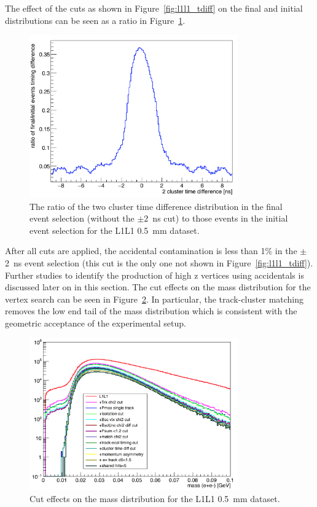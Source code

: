 The effect of the cuts as shown in Figure~\ref{fig:l1l1_tdiff} on the final and initial distributions can be seen as a ratio in Figure~\ref{fig:l1l1_tdiffR}.

\begin{figure}[H]
  \centering
      \includegraphics[width=0.8\textwidth]{plots/ratio_tdiff_cuts.png}
  \caption{The ratio of the two cluster time difference distribution in the final event selection (without the $\pm2$~ns cut) to those events in the initial event selection for the L1L1 0.5~mm dataset.}
  \label{fig:l1l1_tdiffR}
\end{figure}

After all cuts are applied, the accidental contamination is less than 1$\%$ in the $\pm$ 2~ns event selection (this cut is the only one not shown in Figure~\ref{fig:l1l1_tdiff}). Further studies to identify the production of high z vertices using accidentals is discussed later on in this section. The cut effects on the mass distribution for the vertex search can be seen in Figure~\ref{fig:l1l1_mass}. In particular, the track-cluster matching removes the low end tail of the mass distribution which is consistent with the geometric acceptance of the experimental setup.

\begin{figure}[H]
  \centering
      \includegraphics[width=0.8\textwidth]{plots/mass_L1L1_cuts.png}
  \caption{Cut effects on the mass distribution for the L1L1 0.5~mm dataset.}
  \label{fig:l1l1_mass}
\end{figure} 

